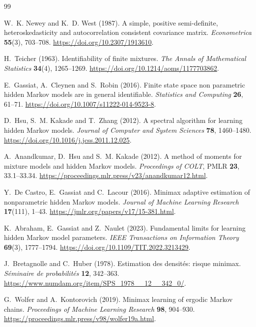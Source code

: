 \documentclass[11pt]{article}
\theoremstyle{definition}
\theoremstyle{remark}
\begin{document}
\begin{thebibliography}{99}

W.~K. Newey and K.~D. West (1987).
A simple, positive semi-definite, heteroskedasticity and autocorrelation
consistent covariance matrix.
\emph{Econometrica} \textbf{55}(3), 703--708.
\url{https://doi.org/10.2307/1913610}.

H.~Teicher (1963).
Identifiability of finite mixtures.
\emph{The Annals of Mathematical Statistics} \textbf{34}(4), 1265--1269.
\url{https://doi.org/10.1214/aoms/1177703862}.

E.~Gassiat, A.~Cleynen and S.~Robin (2016).
Finite state space non parametric hidden Markov models are in general
identifiable.
\emph{Statistics and Computing} \textbf{26}, 61--71.
\url{https://doi.org/10.1007/s11222-014-9523-8}.

D.~Hsu, S.~M. Kakade and T.~Zhang (2012).
A spectral algorithm for learning hidden Markov models.
\emph{Journal of Computer and System Sciences} \textbf{78}, 1460--1480.
\url{https://doi.org/10.1016/j.jcss.2011.12.025}.

A.~Anandkumar, D.~Hsu and S.~M. Kakade (2012).
A method of moments for mixture models and hidden Markov models.
\emph{Proceedings of COLT}, PMLR \textbf{23}, 33.1--33.34.
\url{https://proceedings.mlr.press/v23/anandkumar12.html}.

Y.~De Castro, E.~Gassiat and C.~Lacour (2016).
Minimax adaptive estimation of nonparametric hidden Markov models.
\emph{Journal of Machine Learning Research} \textbf{17}(111), 1--43.
\url{https://jmlr.org/papers/v17/15-381.html}.

K.~Abraham, E.~Gassiat and Z.~Naulet (2023).
Fundamental limits for learning hidden Markov model parameters.
\emph{IEEE Transactions on Information Theory} \textbf{69}(3), 1777--1794.
\url{https://doi.org/10.1109/TIT.2022.3213429}.

J.~Bretagnolle and C.~Huber (1978).
Estimation des densit\'es: risque minimax.
\emph{S\'eminaire de probabilit\'es} \textbf{12}, 342--363.
\url{https://www.numdam.org/item/SPS_1978__12__342_0/}.

G.~Wolfer and A.~Kontorovich (2019).
Minimax learning of ergodic Markov chains.
\emph{Proceedings of Machine Learning Research} \textbf{98}, 904--930.
\url{https://proceedings.mlr.press/v98/wolfer19a.html}.


\end{thebibliography}
\end{document}
